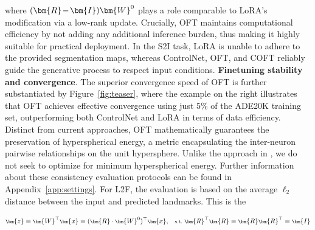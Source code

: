 where $\thickmuskip=2mu \medmuskip=2mu (\bm{R}-\bm{I})\bm{W}^0$ plays a role comparable to LoRA's modification via a low-rank update. Crucially, OFT maintains computational efficiency by not adding any additional inference burden, thus making it highly suitable for practical deployment. In the S2I task, LoRA is unable to adhere to the provided segmentation maps, whereas ControlNet, OFT, and COFT reliably guide the generative process to respect input conditions. \textbf{Finetuning stability and convergence}. The superior convergence speed of OFT is further substantiated by Figure~\ref{fig:teaser}, where the example on the right illustrates that OFT achieves effective convergence using just 5\% of the ADE20K training set, outperforming both ControlNet and LoRA in terms of data efficiency. Distinct from current approaches, OFT mathematically guarantees the preservation of hyperspherical energy, a metric encapsulating the inter-neuron pairwise relationships on the unit hypersphere. Unlike the approach in \cite{liu2021orthogonal}, we do not seek to optimize for minimum hyperspherical energy. Further information about these consistency evaluation protocols can be found in Appendix~\ref{app:settings}. For L2F, the evaluation is based on the average $\ell_2$ distance between the input and predicted landmarks. This is the

\begin{equation}\label{eq:oft_general}
    \footnotesize
    \bm{z}=\bm{W}^\top\bm{x}=(\bm{R}\cdot\bm{W}^0)^\top\bm{x},~~~\text{s.t.}~\bm{R}^\top\bm{R}=\bm{R}\bm{R}^\top=\bm{I}
\end{equation}

